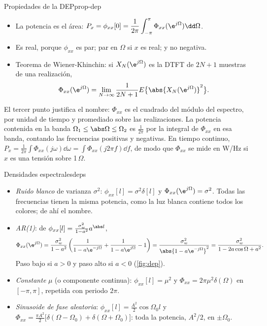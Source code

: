 \documentclass[11pt,a4paper]{scrartcl}
\begin{document}
\begin{propiedad}{Propiedades de la DEP}{prop-dep}
  \begin{itemize}
    \item La potencia es el área: $P_x=\phi_{xx}[0]=\dfrac1{2\pi}\displaystyle\int_{-\pi}^{\pi}\Phi_{xx}(\e^{j\Omega})\dd\Omega$.
    \item Es real, porque $\phi_{xx}$ es par; par en $\Omega$ si $x$ es real; y no negativa.
    \item Teorema de Wiener-Khinchin: si $X_N(\e^{j\Omega})$ es la DTFT de $2N+1$ muestras de una realización,
    \[
      \Phi_{xx}(\e^{j\Omega})=\lim_{N\to\infty}\frac1{2N+1}E\big\{\abs{X_N(\e^{j\Omega})}^2\big\}.
    \]
  \end{itemize}
\end{propiedad}

El tercer punto justifica el nombre: $\Phi_{xx}$ es el cuadrado del módulo del espectro, por unidad de tiempo y promediado sobre las realizaciones. La potencia contenida en la banda $\Omega_1\le\abs\Omega\le\Omega_2$ es $\frac1{2\pi}$ por la integral de $\Phi_{xx}$ en esa banda, contando las frecuencias positivas y negativas. En tiempo continuo, $P_x=\frac1{2\pi}\int\Phi_{xx}(j\omega)\dd\omega=\int\Phi_{xx}(j2\pi f)\dd f$, de modo que $\Phi_{xx}$ se mide en W/Hz si $x$ es una tensión sobre 1\,$\Omega$.

\begin{ejemplo}{Densidades espectrales}{deps}
  \begin{itemize}
    \item \emph{Ruido blanco} de varianza $\sigma^2$: $\phi_{xx}[l]=\sigma^2\delta[l]$ y $\Phi_{xx}(\e^{j\Omega})=\sigma^2$. Todas las frecuencias tienen la misma potencia, como la luz blanca contiene todos los colores; de ahí el nombre.
    \item \emph{AR(1)}: de $\phi_{xx}[l]=\frac{\sigma_w^2}{1-a^2}a^{\abs l}$,
    \[
      \Phi_{xx}(\e^{j\Omega})=\frac{\sigma_w^2}{1-a^2}\left(\frac1{1-a\e^{-j\Omega}}+\frac1{1-a\e^{j\Omega}}-1\right)=\frac{\sigma_w^2}{\abs{1-a\e^{-j\Omega}}^2}=\frac{\sigma_w^2}{1-2a\cos\Omega+a^2}.
    \]
    Paso bajo si $a>0$ y paso alto si $a<0$ (\cref{fig:dep}).
    \item \emph{Constante} $\mu$ (o componente continua): $\phi_{xx}[l]=\mu^2$ y $\Phi_{xx}=2\pi\mu^2\delta(\Omega)$ en $[-\pi,\pi]$, repetida con periodo $2\pi$.
    \item \emph{Sinusoide de fase aleatoria}: $\phi_{xx}[l]=\frac{A^2}2\cos\Omega_0l$ y $\Phi_{xx}=\frac{\pi A^2}2\big[\delta(\Omega-\Omega_0)+\delta(\Omega+\Omega_0)\big]$: toda la potencia, $A^2/2$, en $\pm\Omega_0$.
  \end{itemize}
\end{ejemplo}
\end{document}
